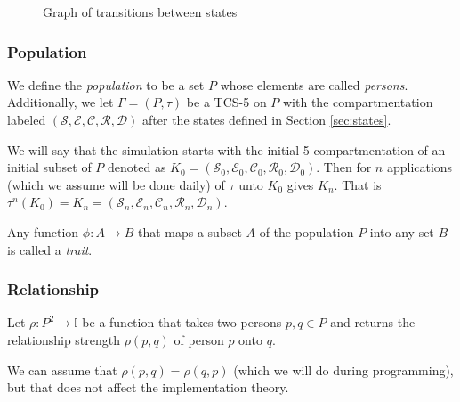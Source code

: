 \documentclass{article}
\newcommand*{\uniti}{\mathbb{I}}
\newcommand*{\mcs}{\mathcal{S}}
\newcommand*{\mce}{\mathcal{E}}
\newcommand*{\mcc}{\mathcal{C}}
\newcommand*{\mcr}{\mathcal{R}}
\newcommand*{\mcd}{\mathcal{D}}
\begin{document}
\begin{figure}[H]
    \centering
    \caption{Graph of transitions between states}
    \label{fig:transgraph-1}
\end{figure}

\subsubsection{Population}
We define the \emph{population} to be a set \(P\) whose elements are called \emph{persons}. Additionally, we let \(\Gamma=(P, \tau)\) be a TCS-5 on \(P\) with the compartmentation labeled \((\mcs,\mce,\mcc,\mcr,\mcd)\) after the states defined in Section \ref{sec:states}.

We will say that the simulation starts with the initial 5-compartmentation of an initial subset of \(P\) denoted as \(K_0 = (\mcs_0, \mce_0, \mcc_0, \mcr_0, \mcd_0)\). Then for \(n\) applications (which we assume will be done daily) of \(\tau\) unto \(K_0\) gives \(K_n\). That is \(\tau^n(K_0) = K_n =  (\mcs_n, \mce_n, \mcc_n, \mcr_n, \mcd_n)\).

Any function \(\phi : A \rightarrow B\) that maps a subset \(A\) of the population \(P\) into any set \(B\) is called a \emph{trait}.

\subsubsection{Relationship}\label{sec:relationship}
Let \(\rho : P^2 \rightarrow \uniti\) be a function that takes two persons \(p, q \in P\) and returns the relationship strength \(\rho(p, q)\) of person \(p\) onto \(q\).

We can assume that \(\rho(p, q) = \rho(q, p)\) (which we will do during programming), but that does not affect the implementation theory.
\end{document}

